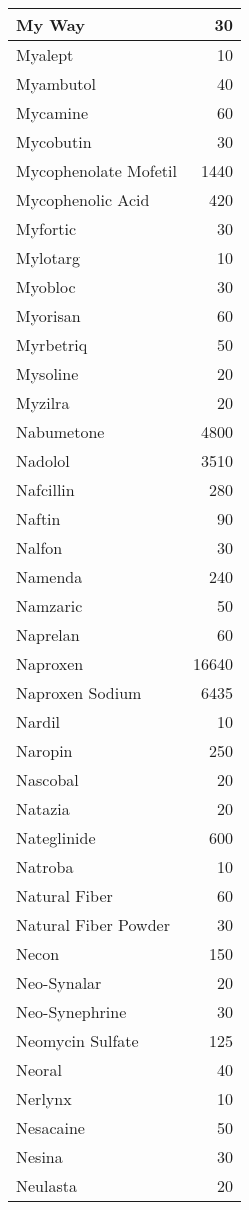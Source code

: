 \documentclass[
]{article}
\begin{document}
\begin{table}
\begin{tabular}[t]{l|r}
\hline
My Way & 30\\
\hline
Myalept & 10\\
\hline
Myambutol & 40\\
\hline
Mycamine & 60\\
\hline
Mycobutin & 30\\
\hline
Mycophenolate Mofetil & 1440\\
\hline
Mycophenolic Acid & 420\\
\hline
Myfortic & 30\\
\hline
Mylotarg & 10\\
\hline
Myobloc & 30\\
\hline
Myorisan & 60\\
\hline
Myrbetriq & 50\\
\hline
Mysoline & 20\\
\hline
Myzilra & 20\\
\hline
Nabumetone & 4800\\
\hline
Nadolol & 3510\\
\hline
Nafcillin & 280\\
\hline
Naftin & 90\\
\hline
Nalfon & 30\\
\hline
Namenda & 240\\
\hline
Namzaric & 50\\
\hline
Naprelan & 60\\
\hline
Naproxen & 16640\\
\hline
Naproxen Sodium & 6435\\
\hline
Nardil & 10\\
\hline
Naropin & 250\\
\hline
Nascobal & 20\\
\hline
Natazia & 20\\
\hline
Nateglinide & 600\\
\hline
Natroba & 10\\
\hline
Natural Fiber & 60\\
\hline
Natural Fiber Powder & 30\\
\hline
Necon & 150\\
\hline
Neo-Synalar & 20\\
\hline
Neo-Synephrine & 30\\
\hline
Neomycin Sulfate & 125\\
\hline
Neoral & 40\\
\hline
Nerlynx & 10\\
\hline
Nesacaine & 50\\
\hline
Nesina & 30\\
\hline
Neulasta & 20\\

\end{tabular}
\end{table}
\end{document}
